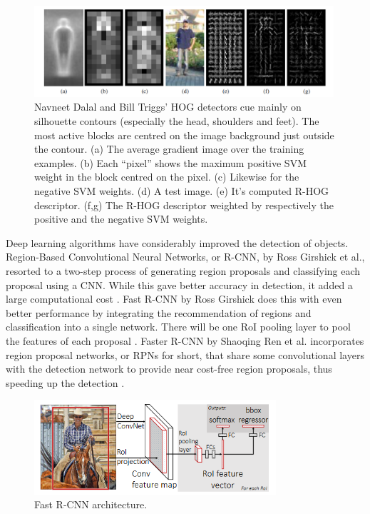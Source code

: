     \begin{figure}[htbp]
        \centering
        \includegraphics[width=0.99\textwidth]{figures/HOG.png}
        \caption{Navneet Dalal and Bill Triggs' HOG detectors cue mainly on silhouette contours (especially the head, shoulders and feet). The most active blocks are centred on the image background just outside the contour. (a) The average gradient image over the training examples. (b) Each “pixel” shows the maximum positive SVM weight in the block centred on the pixel. (c) Likewise for the negative SVM weights. (d) A test image. (e) It’s computed R-HOG descriptor. (f,g) The R-HOG descriptor weighted by respectively the positive and the negative SVM weights. \citep{dalal2005histograms}}
        \label{fig:HOG}
    \end{figure}

    Deep learning algorithms have considerably improved the detection of objects. Region-Based Convolutional Neural Networks, or R-CNN, by Ross Girshick et al., resorted to a two-step process of generating region proposals and classifying each proposal using a CNN. While this gave better accuracy in detection, it added a large computational cost \citep{girshick2014rich}. Fast R-CNN by Ross Girshick does this with even better performance by integrating the recommendation of regions and classification into a single network. There will be one RoI pooling layer to pool the features of each proposal \citep{girshick2015fast}. Faster R-CNN by Shaoqing Ren et al. incorporates region proposal networks, or RPNs for short, that share some convolutional layers with the detection network to provide near cost-free region proposals, thus speeding up the detection \citep{ren2015faster}. \\

    \begin{figure}[htbp]
        \centering
        \includegraphics[width=0.80\textwidth]{figures/Fast_R-CNN.png}
        \caption{Fast R-CNN architecture.\citep{girshick2015fast}}
        \label{fig:FastRCNN}
    \end{figure}

